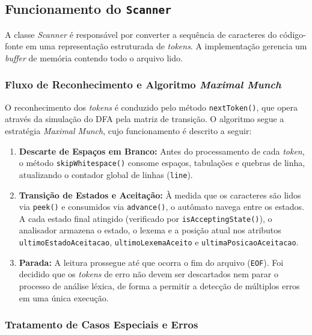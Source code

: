 \documentclass[12pt]{article}
\begin{document}
\subsection{Funcionamento do \texttt{Scanner}}

A classe \textit{Scanner} é responsável por converter a sequência de caracteres do código-fonte em uma representação estruturada de \textit{tokens}. A implementação gerencia um \textit{buffer} de memória contendo todo o arquivo lido.

\subsubsection{Fluxo de Reconhecimento e Algoritmo \textit{Maximal Munch}}

O reconhecimento dos \textit{tokens} é conduzido pelo método \texttt{nextToken()}, que opera através da simulação do DFA pela matriz de transição. 
O algoritmo segue a estratégia \textit{Maximal Munch}, cujo funcionamento é descrito a seguir:

\begin{enumerate}
    \item \textbf{Descarte de Espaços em Branco:} Antes do processamento de cada \textit{token}, o método \texttt{skipWhitespace()} consome espaços, tabulações e quebras de linha, atualizando o contador global de linhas (\texttt{line}).
    
    \item \textbf{Transição de Estados e Aceitação:} À medida que os caracteres são lidos via \texttt{peek()} e consumidos via \texttt{advance()}, o autômato navega entre os estados. 
    A cada estado final atingido (verificado por \texttt{isAcceptingState()}), o analisador armazena o estado, o lexema e a posição atual nos atributos 
    \texttt{ultimoEstadoAceitacao}, \texttt{ultimoLexemaAceito} e \texttt{ultimaPosicaoAceitacao}.
    
    \item \textbf{Parada:} A leitura prossegue até que ocorra o fim do arquivo (\texttt{EOF}). Foi decidido que os 
    \textit{tokens} de erro não devem ser descartados nem parar o processo de análise léxica, de forma a permitir a detecção de múltiplos erros em uma única execução.
\end{enumerate}

\subsubsection{Tratamento de Casos Especiais e Erros}
\end{document}
